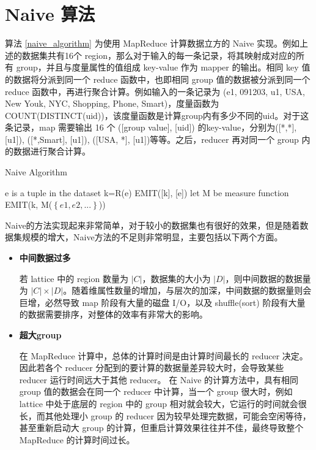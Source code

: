 \section{Naive 算法}

算法 \ref{naive_algorithm} 为使用 MapReduce 计算数据立方的 Naive 实现。例如上述的数据集共有16个 region，那么对于输入的每一条记录，将其映射成对应的所有 group，并且与度量属性的值组成 key-value 作为 mapper 的输出。相同 key 值的数据将分派到同一个 reduce 函数中，也即相同 group 值的数据被分派到同一个 reduce 函数中，再进行聚合计算。例如输入的一条记录为 (e1, 091203, u1, USA, New Youk, NYC, Shopping, Phone, Smart)，度量函数为 COUNT(DISTINCT(uid))，该度量函数是计算group内有多少不同的uid。对于这条记录，map 需要输出 16 个 ([group value], [uid]) 的key-value，分别为([*,*], [u1]), ([*,Smart], [u1]), ([USA, *], [u1])等等。之后，reducer 再对同一个 group 内的数据进行聚合计算。

{\renewcommand\baselinestretch{1} 
\begin{algorithm}[!ht]
\caption{Naive Algorithm}
\label{naive_algorithm}
{\fontfamily{\familydefault}\selectfont

	\begin{algorithmic}[1] %
    	\State e is a tuple in the dataset
        	\State k=R(e)
        	\State EMIT([k], [e])
        \EndFor
   	 \EndFunction
     \State
     	\State let M be measure function
        \State EMIT(k, M($\left\{ e1,e2,...\right\}$))
     \EndFunction
	\end{algorithmic}
}
\end{algorithm}
\par}

Naive的方法实现起来非常简单，对于较小的数据集也有很好的效果，但是随着数据集规模的增大，Naive方法的不足则非常明显，主要包括以下两个方面。

\begin{itemize}

\item \textbf{中间数据过多}

若 lattice 中的 region 数量为 $|C|$，数据集的大小为 $|D|$，则中间数据的数据量为 $|C|\times |D|$。随着维属性数量的增加，与层次的加深，中间数据的数据量则会巨增，必然导致 map 阶段有大量的磁盘 I/O，以及 shuffle(sort) 阶段有大量的数据需要排序，对整体的效率有非常大的影响。

\item \textbf{超大group}

在 MapReduce 计算中，总体的计算时间是由计算时间最长的 reducer 决定。因此若各个 reducer 分配到的要计算的数据量差异较大时，会导致某些 reducer 运行时间远大于其他 reducer。 在 Naive 的计算方法中，具有相同 group 值的数据会在同一个 reducer 中计算，当一个 group 很大时，例如 lattice 中处于底层的 region 中的 group 相对就会较大，它运行的时间就会很长，而其他处理小 group 的 reducer 因为较早处理完数据，可能会空闲等待，甚至重新启动大 group 的计算，但重启计算效果往往并不佳，最终导致整个 MapReduce 的计算时间过长。

\end{itemize}

